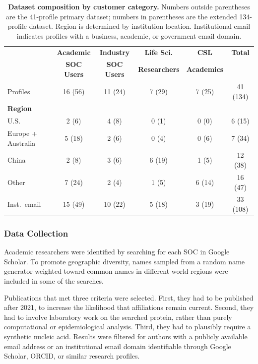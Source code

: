 \documentclass[12pt]{article}
\begin{document}
\begin{table}[H]
\centering
\caption{\textbf{Dataset composition by customer category.} Numbers outside parentheses are the 41-profile primary dataset; numbers in parentheses are the extended 134-profile dataset. Region is determined by institution location. Institutional email indicates profiles with a business, academic, or government email domain.}
\label{tab:dataset}
\begin{tabular}{lccccc}
\toprule
 & \textbf{Academic} & \textbf{Industry} & \textbf{Life Sci.} & \textbf{CSL} & \textbf{Total} \\
 & \textbf{SOC Users} & \textbf{SOC Users} & \textbf{Researchers} & \textbf{Academics} & \\
\midrule
Profiles & 16 (56) & 11 (24) & 7 (29) & 7 (25) & 41 (134) \\
\midrule
\textbf{Region} & & & & & \\
U.S.\ & 2 (6) & 4 (8) & 0 (1) & 0 (0) & 6 (15) \\
Europe + Australia & 5 (18) & 2 (6) & 0 (4) & 0 (6) & 7 (34) \\
China & 2 (8) & 3 (6) & 6 (19) & 1 (5) & 12 (38) \\
Other & 7 (24) & 2 (4) & 1 (5) & 6 (14) & 16 (47) \\
\midrule
Inst.\ email & 15 (49) & 10 (22) & 5 (18) & 3 (19) & 33 (108) \\
\bottomrule
\end{tabular}
\end{table}

\subsubsection{Data Collection}

Academic researchers were identified by searching for each SOC in Google Scholar. To promote geographic diversity, names sampled from a random name generator weighted toward common names in different world regions were included in some of the searches.

Publications that met three criteria were selected. First, they had to be published after 2021, to increase the likelihood that affiliations remain current. Second, they had to involve laboratory work on the searched protein, rather than purely computational or epidemiological analysis. Third, they had to plausibly require a synthetic nucleic acid. Results were filtered for authors with a publicly available email address or an institutional email domain identifiable through Google Scholar, ORCID, or similar research profiles.
\end{document}
